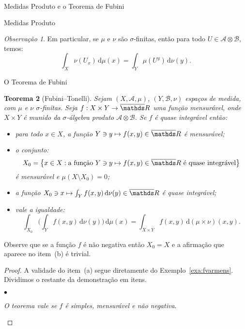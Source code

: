 \documentclass[oneside,final,11pt]{amsbook}
\newcommand{\R}{\mathds R}
\newcommand{\dd}{\mathrm d}
\newcounter{contador}
\newenvironment{bulletindent}{\setcounter{contador}{0}
\begin{list} {$\bullet$}
{\usecounter{contador}
\setlength{\leftmargin}{10pt}
\setlength{\rightmargin}{10pt}
\setlength{\labelsep}{5pt}
\setlength{\itemsep}{10pt}
\setlength{\topsep}{10pt}}}
{\end{list}}
\theoremstyle{remark}\newtheorem{exercise}{Exercício}[chapter]
\theoremstyle{remark}\newtheorem{*exercise}[exercise]{\hbox to 0pt{\hskip 0pt minus 1fil*}Exercício}
\theoremstyle{definition}\newtheorem{exdefin}{Definição}[chapter]
\theoremstyle{plain}\newtheorem{teo}{Teorema}[section]
\theoremstyle{plain}\newtheorem{lem}[teo]{Lema}
\theoremstyle{plain}\newtheorem{prop}[teo]{Proposição}
\theoremstyle{plain}\newtheorem{cor}[teo]{Corolário}
\theoremstyle{definition}\newtheorem{defin}[teo]{Definição}
\theoremstyle{remark}\newtheorem{rem}[teo]{Observação}
\theoremstyle{definition}\newtheorem{notation}[teo]{Notação}
\theoremstyle{definition}\newtheorem{convention}[teo]{Convenção}
\theoremstyle{definition}\newtheorem{example}[teo]{Exemplo}
\numberwithin{section}{chapter}
\numberwithin{equation}{section}
\begin{document}
\begin{chapter}{Medidas Produto e o Teorema de Fubini}
\begin{section}{Medidas Produto}
\begin{rem}
Em particular, se $\mu$ e $\nu$ são $\sigma$-finitas, então para todo $U\in\mathcal A\otimes\mathcal B$, temos:
\[\int_X\nu(U_x)\,\dd\mu(x)=\int_Y\mu(U^y)\,\dd\nu(y).\]
\end{rem}

\end{section}

\begin{section}{O Teorema de Fubini}

\begin{teo}[Fubini--Tonelli]
\label{thm:Fubiniabs}
Sejam $(X,\mathcal A,\mu)$, $(Y,\mathcal B,\nu)$ espaços de medida, com $\mu$ e $\nu$ $\sigma$-finitas.
Seja $f:X\times Y\to\overline\R$ uma função mensurável, onde $X\times Y$ é munido da $\sigma$-álgebra produto $\mathcal A\otimes\mathcal B$.
Se $f$ é quase integrável então:
\begin{itemize}
\item[(a)] para todo $x\in X$, a função $Y\ni y\mapsto f(x,y)\in\overline\R$ é mensurável;
\item[(b)] o conjunto:
\[X_0=\big\{x\in X:\text{a função $Y\ni y\mapsto f(x,y)\in\overline\R$ é quase integrável}\big\}\]
é mensurável e $\mu(X\setminus X_0)=0$;
\item[(c)] a função $X_0\ni x\mapsto\int_Yf(x,y)\,\dd\nu(y)\in\overline\R$ é
quase integrável;
\item[(d)] vale a igualdade:
\[\int_{X_0}\Big(\int_Yf(x,y)\,\dd\nu(y)\Big)\,\dd\mu(x)=\int_{X\times Y}f(x,y)\,\dd(\mu\times\nu)(x,y).\]
\end{itemize}
\end{teo}

Observe que se a função $f$ é não negativa então $X_0=X$ e a afirmação que aparece
no item~(b) é trivial.

\begin{proof}
A validade do item~(a) segue diretamente do Exemplo~\ref{exa:fvarmens}.
Dividimos o restante da demonstração em itens.
\begin{bulletindent}
\item {\em O teorema vale se $f$ é simples, mensurável e não negativa}.


\end{bulletindent}
\end{proof}
\end{section}
\end{chapter}
\end{document}
